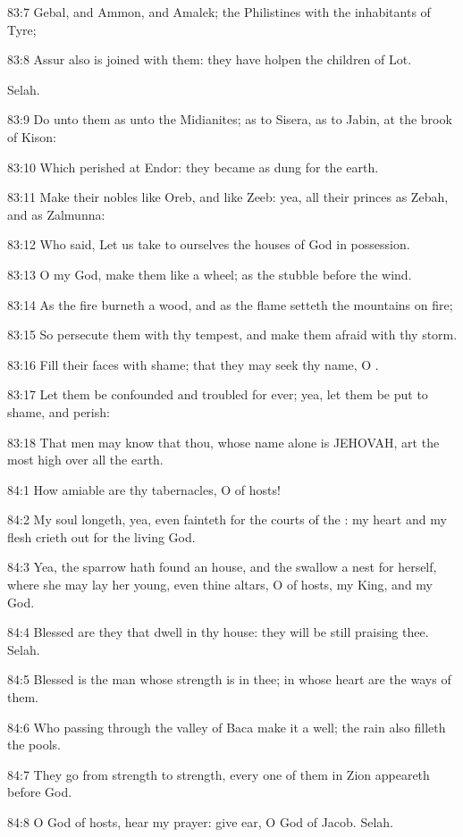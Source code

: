 83:7 Gebal, and Ammon, and Amalek; the Philistines with the
inhabitants of Tyre;

83:8 Assur also is joined with them: they have holpen the children of
Lot.

Selah.

83:9 Do unto them as unto the Midianites; as to Sisera, as to Jabin,
at the brook of Kison:

83:10 Which perished at Endor: they became as dung for the earth.

83:11 Make their nobles like Oreb, and like Zeeb: yea, all their
princes as Zebah, and as Zalmunna:

83:12 Who said, Let us take to ourselves the houses of God in
possession.

83:13 O my God, make them like a wheel; as the stubble before the
wind.

83:14 As the fire burneth a wood, and as the flame setteth the
mountains on fire;

83:15 So persecute them with thy tempest, and make them afraid with
thy storm.

83:16 Fill their faces with shame; that they may seek thy name, O
\LORD.

83:17 Let them be confounded and troubled for ever; yea, let them be
put to shame, and perish:

83:18 That men may know that thou, whose name alone is JEHOVAH, art
the most high over all the earth.



84:1 How amiable are thy tabernacles, O \LORD of hosts!

84:2 My soul longeth, yea, even fainteth for the courts of the \LORD:
my heart and my flesh crieth out for the living God.

84:3 Yea, the sparrow hath found an house, and the swallow a nest for
herself, where she may lay her young, even thine altars, O \LORD of
hosts, my King, and my God.

84:4 Blessed are they that dwell in thy house: they will be still
praising thee. Selah.

84:5 Blessed is the man whose strength is in thee; in whose heart are
the ways of them.

84:6 Who passing through the valley of Baca make it a well; the rain
also filleth the pools.

84:7 They go from strength to strength, every one of them in Zion
appeareth before God.

84:8 O \LORD God of hosts, hear my prayer: give ear, O God of Jacob.
Selah.

